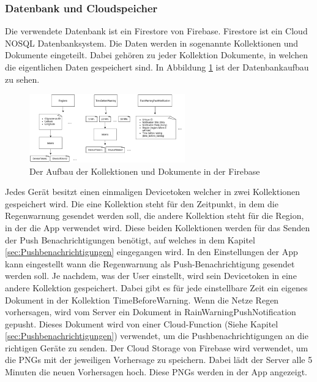 \subsubsection{Datenbank und Cloudspeicher}\label{datenbank und cloudspeicher}
Die verwendete Datenbank ist ein Firestore von Firebase. Firestore ist ein Cloud NOSQL Datenbanksystem. 
Die Daten werden in sogenannte Kollektionen und Dokumente eingeteilt. 
Dabei gehören zu jeder Kollektion Dokumente, in welchen die eigentlichen Daten gespeichert sind. 
In Abbildung \ref{fig:datenbank_aufbau} ist der Datenbankaufbau zu sehen.
\begin{figure}[h]
 \centering
 \includegraphics[width=0.6\textwidth,angle=0]{abb/datenbank_aufbau_uebersicht}
 \caption[Datenbankarchitektur]{Der Aufbau der Kollektionen und Dokumente in der Firebase}
\label{fig:datenbank_aufbau}
\end{figure}

\begin{sloppypar}
Jedes Gerät besitzt einen einmaligen Devicetoken welcher in zwei Kollektionen gespeichert wird. 
Die eine Kollektion steht für den Zeitpunkt, in dem die Regenwarnung gesendet werden soll, die andere Kollektion steht für die Region, in der die App verwendet wird. 
Diese beiden Kollektionen werden für das Senden der Push Benachrichtigungen benötigt, auf welches in dem Kapitel \ref{sec:Pushbenachrichtigungen} eingegangen wird. 
In den Einstellungen der App kann eingestellt wann die Regenwarnung als Push-Benachrichtigung gesendet werden soll.
Je nachdem, was der User einstellt, wird sein Devicetoken in eine andere Kollektion gespeichert. 
Dabei gibt es für jede einstellbare Zeit ein eigenes Dokument in der Kollektion TimeBeforeWarning. 
Wenn die Netze Regen vorhersagen, wird vom Server ein Dokument in RainWarningPushNotification gepusht. 
Dieses Dokument wird von einer Cloud-Function (Siehe Kapitel \ref{sec:Pushbenachrichtigungen}) verwendet, um die Pushbenachrichtigungen an die richtigen Geräte zu senden.
Der Cloud Storage von Firebase wird verwendet, um die PNGs mit der jeweiligen Vorhersage zu speichern.
Dabei lädt der Server alle 5 Minuten die neuen Vorhersagen hoch. Diese PNGs werden in der App angezeigt.
\end{sloppypar}